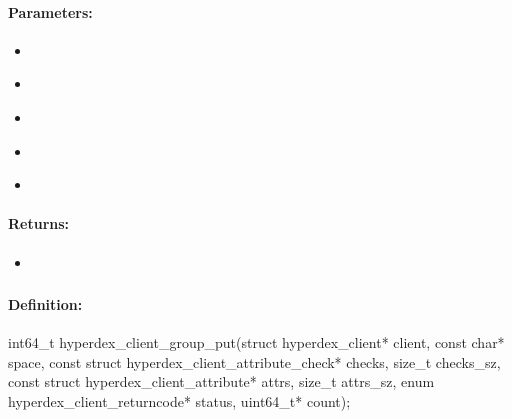 \paragraph{Parameters:}
\begin{itemize}[noitemsep]
\item {}\\

\item {}\\

\item {}\\

\item {}\\

\item {}\\

\end{itemize}

\paragraph{Returns:}
\begin{itemize}[noitemsep]
\item {}\\

\end{itemize}

\pagebreak
\subsubsection{}
\label{api:c:group_put}


\paragraph{Definition:}
\begin{ccode}
int64_t hyperdex_client_group_put(struct hyperdex_client* client,
        const char* space,
        const struct hyperdex_client_attribute_check* checks, size_t checks_sz,
        const struct hyperdex_client_attribute* attrs, size_t attrs_sz,
        enum hyperdex_client_returncode* status,
        uint64_t* count);
\end{ccode}


